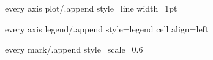 \pgfplotsset
{
  every axis plot/.append style={line width=1pt}
}


\pgfplotsset
{
  every axis legend/.append style={legend cell align=left}
}


\tikzset
{
  every mark/.append style={scale=0.6}
}

